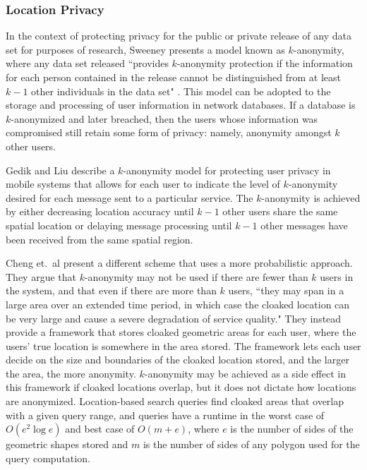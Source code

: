 \subsubsection{Location Privacy}

In the context of protecting privacy for the public or private release of any data set for purposes of research, Sweeney \cite{sweeney} presents a model known as $k$-anonymity, where any data set released ``provides $k$-anonymity protection if the information for each person contained in the release cannot be distinguished from at least $k -1$ other individuals in the data set" \cite{sweeney}. This model can be adopted to the storage and processing of user information in network databases. If a database is $k$-anonymized and later breached, then the users whose information was compromised still retain some form of privacy: namely, anonymity amongst $k$ other users.

Gedik and Liu \cite{gedik} describe a $k$-anonymity model for protecting user privacy in mobile systems that allows for each user to indicate the level of $k$-anonymity desired for each message sent to a particular service. The $k$-anonymity is achieved by either decreasing location accuracy until $k-1$ other users share the same spatial location or delaying message processing until $k-1$ other messages have been received from the same spatial region.

Cheng et.~al \cite{Cheng2006} present a different scheme that uses a more probabilistic approach. They argue that $k$-anonymity may not be used if there are fewer than $k$ users in the system, and that even if there are more than $k$ users, ``they may span in a large area over an extended time period, in which case the cloaked location can be very large and cause a severe degradation of service quality." They instead provide a framework that stores cloaked geometric areas for each user, where the users' true location is somewhere in the area stored. The framework lets each user decide on the size and boundaries of the cloaked location stored, and the larger the area, the more anonymity. $k$-anonymity may be achieved as a side effect in this framework if cloaked locations overlap, but it does not dictate how locations are anonymized. Location-based search queries find cloaked areas that overlap with a given query range, and queries have a runtime in the worst case of $O(e^2\log e)$ and best case of $O(m+e)$, where $e$ is the number of sides of the geometric shapes stored and $m$ is the number of sides of any polygon used for the query computation.

